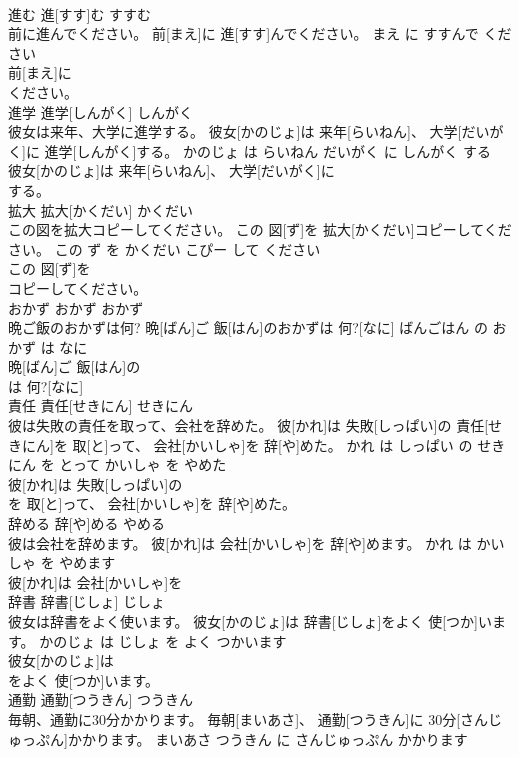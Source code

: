 \documentclass[8pt]{extreport}
\begin{document}
\begin{CJK}{UTF8}{min}
\\	進む	進[すす]む	すすむ	
\\	前に進んでください。	前[まえ]に 進[すす]んでください。	まえ に すすんで ください	
\\	前[まえ]に
\\	ください。		
\\	進学	進学[しんがく]	しんがく	
\\	彼女は来年、大学に進学する。	彼女[かのじょ]は 来年[らいねん]、 大学[だいがく]に 進学[しんがく]する。	かのじょ は らいねん だいがく に しんがく する	
\\	彼女[かのじょ]は 来年[らいねん]、 大学[だいがく]に
\\	する。		
\\	拡大	拡大[かくだい]	かくだい	
\\	この図を拡大コピーしてください。	この 図[ず]を 拡大[かくだい]コピーしてください。	この ず を かくだい こぴー して ください	
\\	この 図[ず]を
\\	コピーしてください。		
\\	おかず	おかず	おかず	
\\	晩ご飯のおかずは何?	晩[ばん]ご 飯[はん]のおかずは 何?[なに]	ばんごはん の おかず は なに	
\\	晩[ばん]ご 飯[はん]の
\\	は 何?[なに]		
\\	責任	責任[せきにん]	せきにん	
\\	彼は失敗の責任を取って、会社を辞めた。	彼[かれ]は 失敗[しっぱい]の 責任[せきにん]を 取[と]って、 会社[かいしゃ]を 辞[や]めた。	かれ は しっぱい の せきにん を とって かいしゃ を やめた	
\\	彼[かれ]は 失敗[しっぱい]の
\\	を 取[と]って、 会社[かいしゃ]を 辞[や]めた。		
\\	辞める	辞[や]める	やめる	
\\	彼は会社を辞めます。	彼[かれ]は 会社[かいしゃ]を 辞[や]めます。	かれ は かいしゃ を やめます	
\\	彼[かれ]は 会社[かいしゃ]を
\\	辞書	辞書[じしょ]	じしょ	
\\	彼女は辞書をよく使います。	彼女[かのじょ]は 辞書[じしょ]をよく 使[つか]います。	かのじょ は じしょ を よく つかいます	
\\	彼女[かのじょ]は
\\	をよく 使[つか]います。		
\\	通勤	通勤[つうきん]	つうきん	
\\	毎朝、通勤に30分かかります。	毎朝[まいあさ]、 通勤[つうきん]に 30分[さんじゅっぷん]かかります。	まいあさ つうきん に さんじゅっぷん かかります	

\end{CJK}
\end{document}
